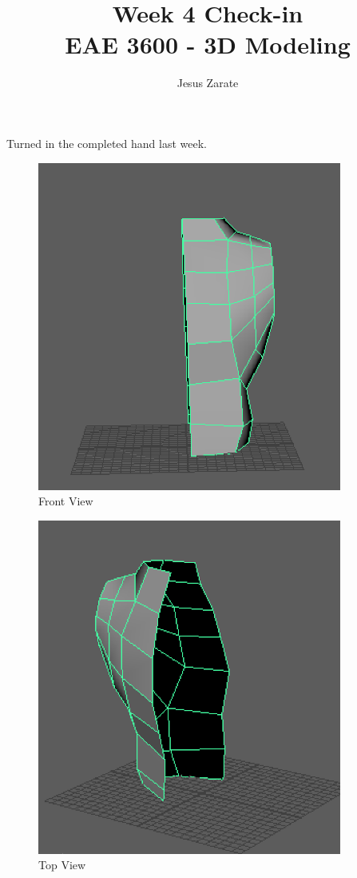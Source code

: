 \documentclass[a4paper]{article}
\title{
  Week 4 Check-in\\
  \large EAE 3600 - 3D Modeling}
\author{Jesus Zarate}
\begin{document}
\maketitle

Turned in the completed hand last week.

\begin{figure}[h]
\centering
\includegraphics[width=10cm]{img/Front.png}
\caption{Front View}
\label{fig:Front View}
\end{figure}

\begin{figure}[h]
\centering
\includegraphics[width=10cm]{img/angle.png}
\caption{Top View}
\label{fig:Angle View}
\end{figure}
\end{document}
